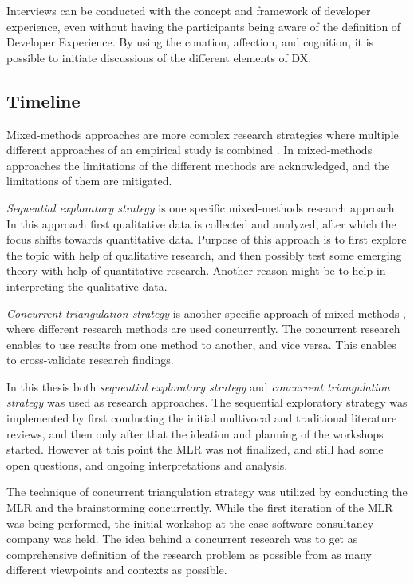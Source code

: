 \documentclass[english, 12pt, a4paper, sci, utf8, a-1b, online]{aaltothesis}
\begin{document}
Interviews can be conducted with the concept and framework of developer experience, even without having the participants being aware of the definition of Developer Experience. By using the conation, affection, and cognition, it is possible to initiate discussions of the different elements of DX.


\subsection{Timeline}

Mixed-methods approaches are more complex research strategies where multiple different approaches of an empirical study is combined \citep{easterbrook2008selecting}. In mixed-methods approaches the limitations of the different methods are acknowledged, and the limitations of them are mitigated.

\textit{Sequential exploratory strategy} is one specific mixed-methods research approach. In this approach first qualitative data is collected and analyzed, after which the focus shifts towards quantitative data. Purpose of this approach is to first explore the topic with help of qualitative research, and then possibly test some emerging theory with help of quantitative research. Another reason might be to help in interpreting the qualitative data.

\textit{Concurrent triangulation strategy} is another specific approach of mixed-methods \citep{easterbrook2008selecting}, where different research methods are used concurrently. The concurrent research enables to use results from one method to another, and vice versa. This enables to cross-validate research findings.

In this thesis both \textit{sequential exploratory strategy} and \textit{concurrent triangulation strategy} was used as research approaches. The sequential exploratory strategy was implemented by first conducting the initial multivocal and traditional literature reviews, and then only after that the ideation and planning of the workshops started. However at this point the MLR was not finalized, and still had some open questions, and ongoing interpretations and analysis.

The technique of concurrent triangulation strategy was utilized by conducting the MLR and the brainstorming concurrently. While the first iteration of the MLR was being performed, the initial workshop at the case software consultancy company was held. The idea behind a concurrent research was to get as comprehensive definition of the research problem as possible from as many different viewpoints and contexts as possible.
\end{document}
